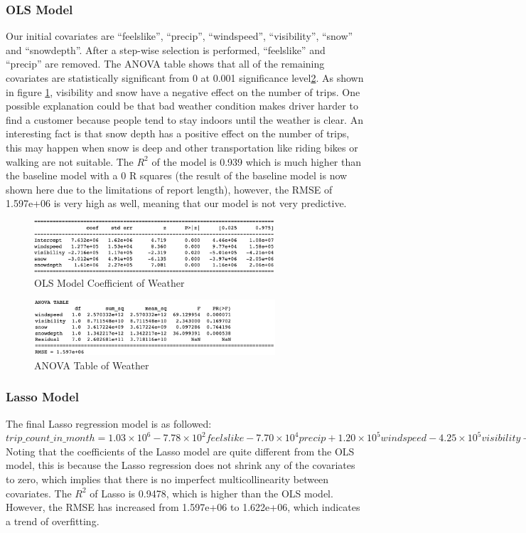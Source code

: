 \documentclass[11pt]{article}
\begin{document}
\subsubsection{OLS Model}
Our initial covariates are ``feelslike'', ``precip'', ``windspeed'', ``visibility'', ``snow'' and ``snowdepth''. After a step-wise selection is performed, ``feelslike'' and ``precip'' are removed. The ANOVA table shows that all of the remaining covariates are statistically significant from 0 at 0.001 significance level\ref{fig:weatheranova}. As shown in figure \ref{fig:weathercoef}, visibility and snow have a negative effect on the number of trips. One possible explanation could be that bad weather condition makes driver harder to find a customer because people tend to stay indoors until the weather is clear. An interesting fact is that snow depth has a positive effect on the number of trips, this may happen when snow is deep and other transportation like riding bikes or walking are not suitable. The $R^2$ of the model is 0.939 which is much higher than the baseline model with a 0 R squares (the result of the baseline model is now shown here due to the limitations of report length), however, the RMSE of 1.597e+06 is very high as well, meaning that our model is not very predictive.
\begin{figure}[h]
    \includegraphics[width=0.8\textwidth]{plots/olsweathercoef.png}
    \centering
    \caption{OLS Model Coefficient of Weather}
    \label{fig:weathercoef}
\end{figure}
\begin{figure}[h]
    \includegraphics[width=0.8\textwidth]{plots/anovaweather.png}
    \centering
    \caption{ANOVA Table of Weather}
    \label{fig:weatheranova}
\end{figure}
\subsubsection{Lasso Model}
The final Lasso regression model is as followed: $trip\_count\_in\_month = 1.03\times10^6 - 7.78\times10^2feelslike -7.70\times10^4precip + 1.20\times10^5windspeed - 4.25\times10^5visibility -3.08\times10^6snow + 1.63\times10^6snowdepth.$ Noting that the coefficients of the Lasso model are quite different from the OLS model, this is because the Lasso regression does not shrink any of the covariates to zero, which implies that there is no imperfect multicollinearity between covariates. The $R^2$ of Lasso is 0.9478, which is higher than the OLS model. However, the RMSE has increased from 1.597e+06 to 1.622e+06, which indicates a trend of overfitting.
\end{document}
